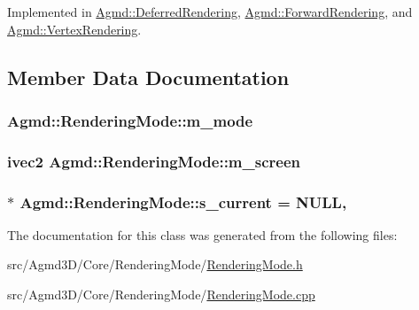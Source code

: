 Implemented in \hyperlink{class_agmd_1_1_deferred_rendering_ac6aaad52470c21daebdb59855e201b34}{Agmd\+::\+Deferred\+Rendering}, \hyperlink{class_agmd_1_1_forward_rendering_a2b3207d31479b4aabda32e0c7de8fc7a}{Agmd\+::\+Forward\+Rendering}, and \hyperlink{class_agmd_1_1_vertex_rendering_ac03dd545b910070c14d4c478e2c6d936}{Agmd\+::\+Vertex\+Rendering}.



\subsection{Member Data Documentation}
\hypertarget{class_agmd_1_1_rendering_mode_a379cfc61b76ac3a58c5aa81db26fa5e6}{
\subsubsection[{m\+\_\+mode}]{ Agmd\+::\+Rendering\+Mode\+::m\+\_\+mode\hspace{0.3cm}{\ttfamily [protected]}}}\label{class_agmd_1_1_rendering_mode_a379cfc61b76ac3a58c5aa81db26fa5e6}
\hypertarget{class_agmd_1_1_rendering_mode_a235cb3db6faec56369f13bdaa75282ae}{
\subsubsection[{m\+\_\+screen}]{\setlength{\rightskip}{0pt plus 5cm}ivec2 Agmd\+::\+Rendering\+Mode\+::m\+\_\+screen\hspace{0.3cm}{\ttfamily [protected]}}}\label{class_agmd_1_1_rendering_mode_a235cb3db6faec56369f13bdaa75282ae}
\hypertarget{class_agmd_1_1_rendering_mode_a5cf89e3c1db7cc337f8734dab3b4e4ca}{
\subsubsection[{s\+\_\+current}]{ $\ast$ Agmd\+::\+Rendering\+Mode\+::s\+\_\+current = N\+U\+L\+L\hspace{0.3cm}{\ttfamily [static]}, {\ttfamily [protected]}}}\label{class_agmd_1_1_rendering_mode_a5cf89e3c1db7cc337f8734dab3b4e4ca}


The documentation for this class was generated from the following files\+:\begin{DoxyCompactItemize}
\item 
src/\+Agmd3\+D/\+Core/\+Rendering\+Mode/\hyperlink{_rendering_mode_8h}{Rendering\+Mode.\+h}\item 
src/\+Agmd3\+D/\+Core/\+Rendering\+Mode/\hyperlink{_rendering_mode_8cpp}{Rendering\+Mode.\+cpp}\end{DoxyCompactItemize}
